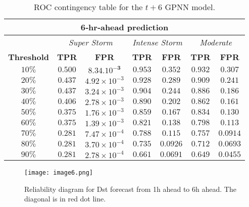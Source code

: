 \begin{table}[ht]
	\centering
	\caption{ROC contingency table for the $t+6$ GPNN model.}
	\label{table:rocgpnn6h}
	\begin{tabular}
		{c| c c | c c | c c}
		\hline
		\multicolumn{7}{c}{\textbf{6‐hr‐ahead prediction}} \\ 
		\hline
		 & \multicolumn{2}{c}{\textit{Super Storm}} & \multicolumn{2}{c}{\textit{Intense Storm}} & \multicolumn{2}{c}{\textit{Moderate}} \\ 
		\hline
		\textbf{Threshold} & \textbf{TPR} & \textbf{FPR} & \textbf{TPR} & \textbf{FPR} & \textbf{TPR} & \textbf{FPR} \\ 
		\hline
		$ 10\%$ & $\mathbf{0.500}$ & $\mathbf{8.34.10^{-3}}$ & $ 0.953 $ & $ 0.352 $ & $ 0.932 $ & $ 0.307 $ \\ 
		$ 20\%$ & $ 0.437 $ & $4.92\times10^{-3}$ & $ 0.928 $ & $ 0.289 $ & $ 0.909 $ & $ 0.241 $ \\ 
		$ 30\%$ & $ 0.437 $ & $3.24\times10^{-3}$ & $ 0.904 $ & $ 0.244 $ & $ 0.886 $ & $ 0.186 $ \\ 
		$ 40\%$ & $ 0.406 $ & $2.78\times10^{-3}$ & $ 0.890 $ & $ 0.202 $ & $ 0.862 $ & $ 0.161 $ \\ 
		$ 50\%$ & $ 0.375 $ & $1.76\times10^{-3}$ & $\mathbf{0.859}$ & $\mathbf{0.167}$ & $\mathbf{0.834}$ & $\mathbf{0.130}$\\ 
		$ 60\%$ & $ 0.375 $ & $1.39\times10^{-3}$ & $ 0.821 $ & $ 0.138 $ & $ 0.798 $ & $ 0.113 $ \\ 
		$ 70\%$ & $ 0.281 $ & $7.47\times10^{-4}$ & $ 0.788 $ & $ 0.115 $ & $ 0.757 $ & $ 0.0914 $ \\ 
		$ 80\%$ & $ 0.281 $ & $3.70\times10^{-4}$ & $ 0.735 $ & $ 0.0926 $ & $ 0.712 $ & $ 0.0693 $ \\ 
		$ 90\%$ & $ 0.281 $ & $2.78\times10^{-4}$ & $ 0.661 $ & $ 0.0691 $ & $ 0.649 $ & $ 0.0455 $ \\
		\hline
	\end{tabular}
\end{table}





\begin{figure}
	\texttt{[image: image6.png]}
	\caption{Reliability diagram for Dst forecast from 1h ahead to 6h ahead. The diagonal is in red dot line.}
	\label{fig:gpnnreliability}
\end{figure}


